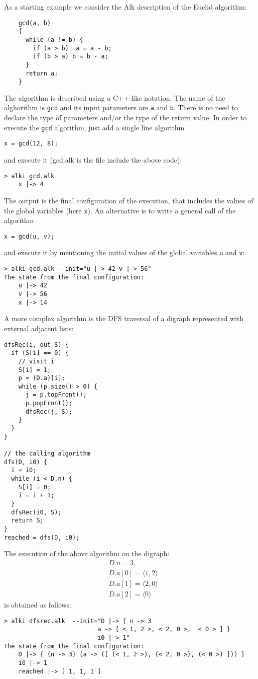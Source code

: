 \documentclass[a4paper]{report}
\begin{document}
As a starting example we consider the Alk description of the Euclid algorithm:
\begin{verbatim}
    gcd(a, b)
    {
      while (a != b) {
        if (a > b)  a = a - b;
        if (b > a) b = b - a;
      }
      return a;
    }
\end{verbatim}
The algorithm is described using a C++-like notation. The name of the alghorithm is \texttt{gcd} and its input parameters are \texttt{a} and \texttt{b}. There is no need to declare the type of parameters and/or the type of the return value.
In order to execute the \texttt{gcd} algorithm, just add a single line algorithm 
\begin{verbatim}
x = gcd(12, 8);
\end{verbatim}
and execute it (gcd.alk is the file include the above code):
\begin{verbatim}
> alki gcd.alk 
    x |-> 4
\end{verbatim}
The output is the final configuration of the execution, that includes the values of the global variables (here {\tt x}).
An alternative is to write a general call of the algorithm
\begin{verbatim}
x = gcd(u, v);
\end{verbatim}
and execute it by mentioning the initial values of the global variables {\tt u} and {\tt v}:
\begin{verbatim}
> alki gcd.alk --init="u |-> 42 v |-> 56"
The state from the final configuration:
    u |-> 42
    v |-> 56
    x |-> 14
\end{verbatim}

A more complex algorithm is the DFS traversal of a digraph represented with external adjacent lists:
\begin{verbatim}
dfsRec(i, out S) {
  if (S[i] == 0) {
    // visit i
    S[i] = 1;
    p = (D.a)[i];
    while (p.size() > 0) {
      j = p.topFront();
      p.popFront();
      dfsRec(j, S);
    }
  }
}

// the calling algorithm
dfs(D, i0) {
  i = i0;
  while (i < D.n) {
    S[i] = 0;
    i = i + 1;
  }
  dfsRec(i0, S);
  return S;
}
reached = dfs(D, i0);
\end{verbatim}
The execution of the above algorithm on the digraph:
\begin{align*}
&D.n = 3,\\
&D.a[0] = \langle 1,2\rangle\\
&D.a[1] = \langle2, 0\rangle\\
&D.a[2] = \langle0\rangle
\end{align*}
is obtained as follows:
\begin{verbatim}
> alki dfsrec.alk  --init="D |-> { n -> 3
                          a -> [ < 1, 2 >, < 2, 0 >,  < 0 > ] }
                          i0 |-> 1"
The state from the final configuration:
    D |-> { (n -> 3) (a -> ([ (< 1, 2 >), (< 2, 0 >), (< 0 >) ])) }
    i0 |-> 1
    reached |-> [ 1, 1, 1 ]
\end{verbatim}
\end{document}
